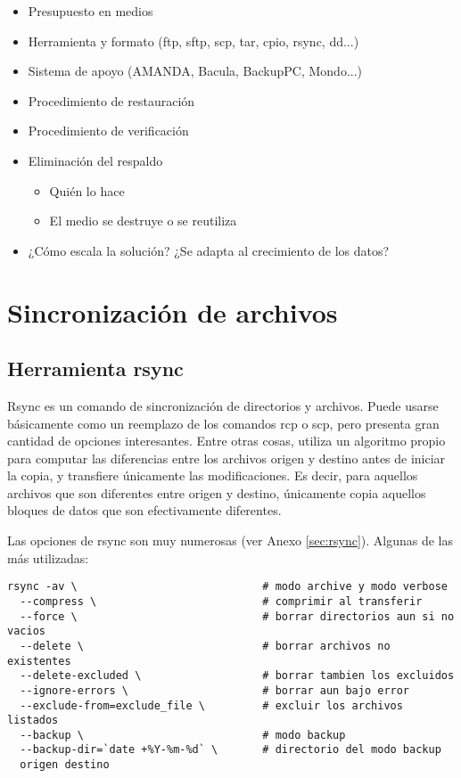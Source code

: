 \begin{itemize}
\begin{itemize}
	\end{itemize}
	\item Presupuesto en medios
	\item Herramienta y formato (ftp, sftp, scp, tar, cpio, rsync, dd...)  
	\item Sistema de apoyo (AMANDA, Bacula, BackupPC, Mondo...)
	\item Procedimiento de restauración
	\item Procedimiento de verificación
	\item Eliminación del respaldo
	\begin{itemize}
		\item Quién lo hace
		\item El medio se destruye o se reutiliza 
	\end{itemize}
	\item ¿Cómo escala la solución? ¿Se adapta al crecimiento de los datos?
\end{itemize}



\section{Sincronización de archivos}

\subsection{Herramienta rsync}

Rsync es un comando de sincronización de directorios y archivos. Puede usarse básicamente como un reemplazo de los comandos rcp o scp, pero presenta gran cantidad de opciones interesantes. Entre otras cosas, utiliza un algoritmo propio para computar las diferencias entre los archivos origen y destino antes de iniciar la copia, y transfiere únicamente las modificaciones. Es decir, para aquellos archivos que son diferentes entre origen y destino, únicamente copia aquellos bloques de datos que son efectivamente diferentes.  

Las opciones de rsync son muy numerosas (ver Anexo \ref{sec:rsync}). Algunas de las más utilizadas:


\begin{lstlisting}
rsync -av \                             # modo archive y modo verbose
  --compress \                          # comprimir al transferir
  --force \                             # borrar directorios aun si no vacios
  --delete \                            # borrar archivos no existentes
  --delete-excluded \                   # borrar tambien los excluidos
  --ignore-errors \                     # borrar aun bajo error
  --exclude-from=exclude_file \         # excluir los archivos listados
  --backup \                            # modo backup
  --backup-dir=`date +%Y-%m-%d` \       # directorio del modo backup
  origen destino
\end{lstlisting}

